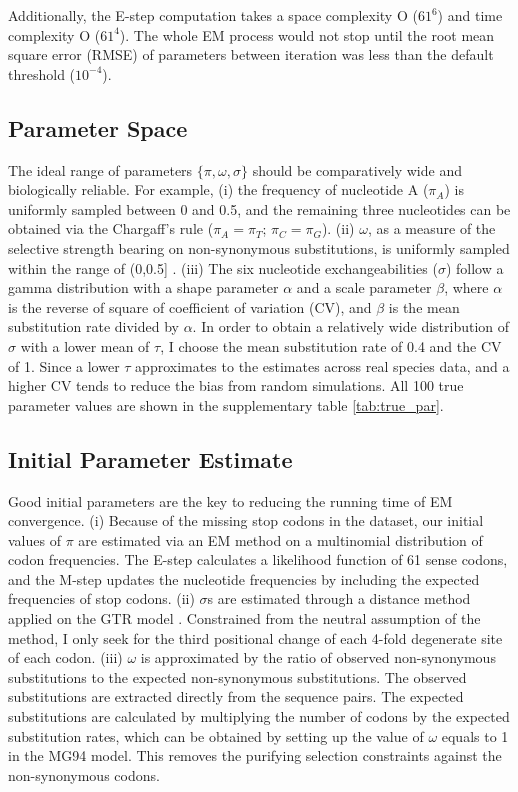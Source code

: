 Additionally, the E-step computation takes a space complexity O ($61^6$) and time complexity O ($61^4$). The whole EM process would not stop until the root mean square error (RMSE) of parameters between iteration was less than the default threshold ($10^{-4}$).




\subsection{Parameter Space}
The ideal range of parameters  $\{\pi, \omega, \sigma \}$ should be comparatively wide and biologically reliable. For example, (i) the frequency of nucleotide A ($\pi_A$) is uniformly sampled between 0 and 0.5, and the remaining three nucleotides can be obtained via the Chargaff’s rule ($\pi_A=\pi_T$; $\pi_C=\pi_G$). (ii) $\omega$, as a measure of the selective strength bearing on non-synonymous substitutions, is uniformly sampled within the range of (0,0.5] \parencite{zou2021nonsynonymous}. (iii) The six nucleotide exchangeabilities ($\sigma$) follow a gamma distribution with a shape parameter $\alpha$ and a scale parameter $\beta$, where $\alpha$ is the reverse of square of coefficient of variation (CV), and $\beta$ is the mean substitution rate divided by $\alpha$. In order to obtain a relatively wide distribution of $\sigma$ with a lower mean of $\tau$, I choose the mean substitution rate of 0.4 and the CV of 1. Since a lower $\tau$ approximates to the estimates across real species data, and a higher CV tends to reduce the bias from random simulations. All 100 true parameter values are shown in the supplementary table \ref{tab:true_par}.  

\subsection{Initial Parameter Estimate}
Good initial parameters are the key to reducing the running time of EM convergence. (i) Because of the missing stop codons in the dataset, our initial values of $\pi$ are estimated via an EM method on a multinomial distribution of codon frequencies. The E-step calculates a likelihood function of 61 sense codons, and the M-step updates the nucleotide frequencies by including the expected frequencies of stop codons. (ii) $\sigma$s are estimated through a distance method applied on the GTR model \parencite{felsenstein2004inferring}. Constrained from the neutral assumption of the method, I only seek for the third positional change of each 4-fold degenerate site of each codon. (iii) $\omega$ is approximated by the ratio of observed non-synonymous substitutions to the expected non-synonymous substitutions. The observed substitutions are extracted directly from the sequence pairs. The expected substitutions are calculated by multiplying the number of codons by the expected substitution rates, which can be obtained by setting up the value of $\omega$ equals to 1 in the MG94 model. This removes the purifying selection constraints against the non-synonymous codons.  

